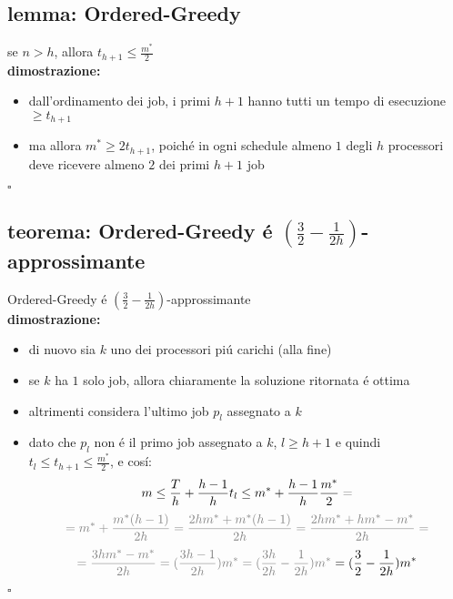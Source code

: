 
\subsection*{lemma: Ordered-Greedy}
\begin{flushleft}
	se $n>h$, allora $t_{h+1}\leq\frac{m^*}{2}$ \newline \\
	\vspace{0.5cm}
	\textbf{dimostrazione:}
	\begin{itemize}
		\item dall'ordinamento dei job, i primi $h+1$ hanno tutti un tempo di esecuzione $\geq t_{h+1}$
		\item ma allora $m^*\geq 2 t_{h+1}$, poich\'e in ogni schedule almeno $1$ degli $h$ processori deve ricevere almeno $2$ dei primi $h+1$ job
	\end{itemize}
	\hfill$\square$
\end{flushleft}


\subsection*{teorema: Ordered-Greedy \'e $(\frac{3}{2}-\frac{1}{2h})$-approssimante}
\begin{flushleft}
	Ordered-Greedy \'e $(\frac{3}{2}-\frac{1}{2h})$-approssimante \newline \\
	\vspace{0.5cm}
	\textbf{dimostrazione:}
	\begin{itemize}
		\item di nuovo sia $k$ uno dei processori pi\'u carichi (alla fine)
		\item se $k$ ha $1$ solo job, allora chiaramente la soluzione ritornata \'e ottima
		\item altrimenti considera l'ultimo job $p_l$ assegnato a $k$
		\item dato che $p_l$ non \'e il primo job assegnato a $k$, $l\geq h+1$ e quindi $t_l\leq t_{h+1}\leq\frac{m^*}{2}$, e cos\'i:
			$$m\leq\frac{T}{h}+\frac{h-1}{h}t_l\leq m^*+\frac{h-1}{h}\frac{m^*}{2}\color{gray}=$$
			$$\color{gray}=m^*+\frac{m^*(h-1)}{2h}=\frac{2hm^*+m^*(h-1)}{2h}=\frac{2hm^*+hm^*-m^*}{2h}=$$
			$$\color{gray}=\frac{3hm^*-m^*}{2h}=(\frac{3h-1}{2h})m^*=(\frac{3h}{2h}-\frac{1}{2h})m^*\color{black}=(\frac{3}{2}-\frac{1}{2h})m^*$$
	\end{itemize}
	\hfill$\square$
\end{flushleft}


